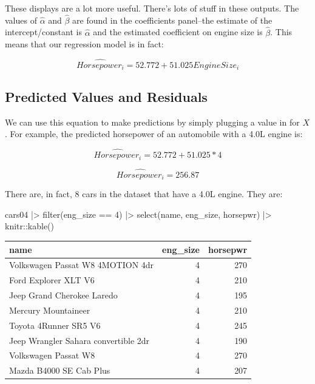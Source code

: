 \documentclass[
  letterpaper,
]{book}
\newenvironment{Shaded}{\begin{snugshade}}{\end{snugshade}}
\newcommand{\DecValTok}[1]{\textcolor[rgb]{0.68,0.00,0.00}{#1}}
\newcommand{\FunctionTok}[1]{\textcolor[rgb]{0.28,0.35,0.67}{#1}}
\newcommand{\NormalTok}[1]{\textcolor[rgb]{0.00,0.23,0.31}{#1}}
\newcommand{\SpecialCharTok}[1]{\textcolor[rgb]{0.37,0.37,0.37}{#1}}
\begin{document}
These displays are a lot more useful. There's lots of stuff in these
outputs. The values of \(\hat{\alpha}\) and \(\hat{\beta}\) are found in
the coefficients panel--the estimate of the intercept/constant is
\(\hat{\alpha}\) and the estimated coefficient on engine size is
\(\hat{\beta}\). This means that our regression model is in fact:

\begin{equation}
\hat{Horsepower_{i}} = 52.772 + 51.025 EngineSize_{i} 
\end{equation}

\subsection{Predicted Values and
Residuals}\label{predicted-values-and-residuals}

We can use this equation to make predictions by simply plugging a value
in for \(X\). For example, the predicted horsepower of an automobile
with a 4.0L engine is:

\begin{equation}
\hat{Horsepower_{i}} = 52.772 + 51.025 * 4 
\end{equation}

\begin{equation}
\hat{Horsepower_{i}} = 256.87
\end{equation}

There are, in fact, 8 cars in the dataset that have a 4.0L engine. They
are:

\begin{Shaded}
\begin{Highlighting}[]
\NormalTok{cars04 }\SpecialCharTok{|\textgreater{}} 
  \FunctionTok{filter}\NormalTok{(eng\_size }\SpecialCharTok{==} \DecValTok{4}\NormalTok{) }\SpecialCharTok{|\textgreater{}} 
  \FunctionTok{select}\NormalTok{(name, eng\_size, horsepwr) }\SpecialCharTok{|\textgreater{}} 
\NormalTok{  knitr}\SpecialCharTok{::}\FunctionTok{kable}\NormalTok{()}
\end{Highlighting}
\end{Shaded}

\begin{longtable}[]{@{}lrr@{}}
\toprule\noalign{}
name & eng\_size & horsepwr \\
\midrule\noalign{}
\endhead
\bottomrule\noalign{}
\endlastfoot
Volkswagen Passat W8 4MOTION 4dr & 4 & 270 \\
Ford Explorer XLT V6 & 4 & 210 \\
Jeep Grand Cherokee Laredo & 4 & 195 \\
Mercury Mountaineer & 4 & 210 \\
Toyota 4Runner SR5 V6 & 4 & 245 \\
Jeep Wrangler Sahara convertible 2dr & 4 & 190 \\
Volkswagen Passat W8 & 4 & 270 \\
Mazda B4000 SE Cab Plus & 4 & 207 \\
\end{longtable}
\end{document}
